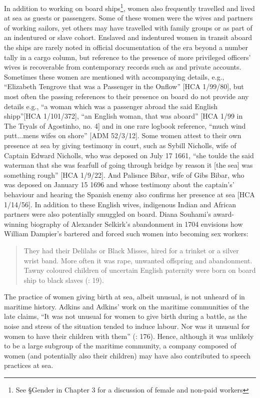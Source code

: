 In addition to working on board ships\footnote{See §Gender in Chapter 3 for a discussion of female  and non-paid workers}, women also frequently travelled and lived at sea as guests or passengers. Some of these women were the wives and partners of working sailors, yet others may have travelled with family groups or as part of an indentured or slave cohort. Enslaved and indentured women in transit aboard the ships are rarely noted in official documentation of the era beyond a number tally in a cargo column, but reference to the presence of more privileged officers’ wives is recoverable from contemporary records such as  and private accounts. Sometimes these women are mentioned with accompanying details, e.g., “Elizabeth Tengrove that was a Passenger in the Onflow” [HCA 1/99/80], but most often the passing references to their presence on board do not provide any details e.g., “a woman which was a passenger abroad the said English shipp”[HCA 1/101/372], “an English woman, that was aboard” [HCA 1/99 in The Tryals of Agostinho, no. 4] and in one rare logbook reference, “much wind putt...mens wifes on shore” [ADM 52/3/12]. Some women attest to their own presence at sea by giving testimony in court, such as Sybill Nicholls, wife of Captain Edward Nicholls, who was deposed on July 17 1661, “she toulde the said waterman that she was fearfull of going through bridge by reason it [the sea] was something rough” [HCA 1/9/22]. And Palisnce Bibar, wife of  Gibs Bibar, who was deposed on January 15 1696 and whose testimony about the captain's’ behaviour and hearing the Spanish enemy also confirms her presence at sea [HCA 1/14/56]. In addition to these English wives, indigenous Indian and African partners were also potentially smuggled on board. Diana Souhami’s award-winning biography of Alexander Selkirk’s abandonment in 1704 envisions how William Dampier’s  bartered and forced such women into becoming sex workers:

\begin{quotation}
They had their Delilahs or Black Misses, hired for a trinket or a silver wrist band. More often it was rape, unwanted offspring and abandonment. Tawny coloured children of uncertain English paternity were born on board ship to black slaves (\citealt{Souhami2013}: 19).\end{quotation}

The practice of women giving birth at sea, albeit unusual, is not unheard of in maritime history. Adkins and Adkins’ work on the maritime communities of the late  claims, “It was not unusual for women to give birth during a battle, as the noise and stress of the situation tended to induce labour. Nor was it unusual for women to have their children with them” (\citealt{AdkinsAdkins2008}: 176). Hence, although it was unlikely to be a large subgroup of the maritime community, a company composed of women (and potentially also their children) may have also contributed to speech practices at sea. 


